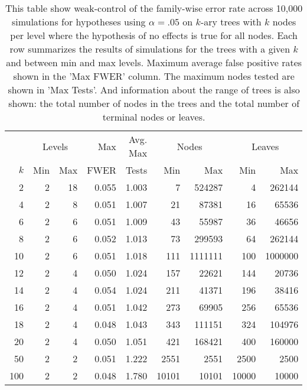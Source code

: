 \begin{table}[ht]
\centering
\begin{tabular}{rrrrrrrrr}
  \toprule
  &\multicolumn{2}{c}{Levels} &Max&Avg. Max& \multicolumn{2}{c}{Nodes} & \multicolumn{2}{c}{Leaves}\\ $k$ & Min & Max & FWER & Tests & Min & Max & Min & Max \\ \midrule
   2 &    2 &   18 & 0.055 & 1.003 &    7 & 524287 &    4 & 262144 \\ 
     4 &    2 &    8 & 0.051 & 1.007 &   21 & 87381 &   16 & 65536 \\ 
     6 &    2 &    6 & 0.051 & 1.009 &   43 & 55987 &   36 & 46656 \\ 
     8 &    2 &    6 & 0.052 & 1.013 &   73 & 299593 &   64 & 262144 \\ 
    10 &    2 &    6 & 0.051 & 1.018 &  111 & 1111111 &  100 & 1000000 \\ 
    12 &    2 &    4 & 0.050 & 1.024 &  157 & 22621 &  144 & 20736 \\ 
    14 &    2 &    4 & 0.054 & 1.024 &  211 & 41371 &  196 & 38416 \\ 
    16 &    2 &    4 & 0.051 & 1.042 &  273 & 69905 &  256 & 65536 \\ 
    18 &    2 &    4 & 0.048 & 1.043 &  343 & 111151 &  324 & 104976 \\ 
    20 &    2 &    4 & 0.050 & 1.051 &  421 & 168421 &  400 & 160000 \\ 
    50 &    2 &    2 & 0.051 & 1.222 & 2551 & 2551 & 2500 & 2500 \\ 
   100 &    2 &    2 & 0.048 & 1.780 & 10101 & 10101 & 10000 & 10000 \\ 
   \bottomrule
\end{tabular}
\caption{This table show weak-control of the
  family-wise error rate across 10,000 simulations for hypotheses using
  $\alpha=.05$ on $k$-ary trees with $k$ nodes per level where the hypothesis
  of no effects is true for all nodes. Each row summarizes the results of
  simulations for the trees with a given $k$ and between min and max levels.
  Maximum average false positive rates shown in the 'Max FWER' column. The
  maximum nodes tested are shown in 'Max Tests'. And information about the
  range of trees is also shown: the total number of nodes in the trees and the
  total number of terminal nodes or leaves.} 
\label{tab:weak_control_sim}
\end{table}
